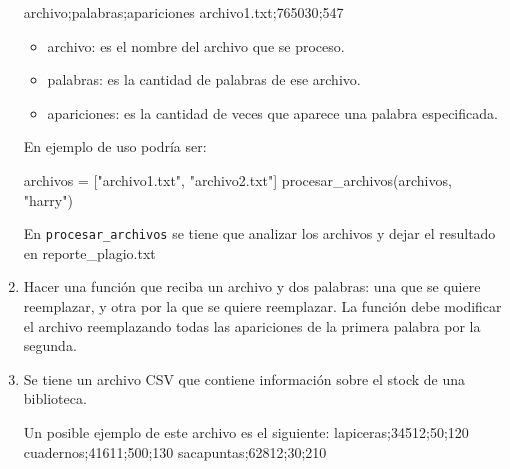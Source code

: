 \documentclass[
  letterpaper,
  DIV=11,
  numbers=noendperiod]{scrreprt}
\newenvironment{Shaded}{\begin{snugshade}}{\end{snugshade}}
\newcommand{\ExtensionTok}[1]{\textcolor[rgb]{0.00,0.23,0.31}{#1}}
\newcommand{\KeywordTok}[1]{\textcolor[rgb]{0.00,0.23,0.31}{#1}}
\newcommand{\NormalTok}[1]{\textcolor[rgb]{0.00,0.23,0.31}{#1}}
\newcommand{\OperatorTok}[1]{\textcolor[rgb]{0.37,0.37,0.37}{#1}}
\newcommand{\StringTok}[1]{\textcolor[rgb]{0.13,0.47,0.30}{#1}}
\providecommand{\tightlist}{%
  \setlength{\itemsep}{0pt}\setlength{\parskip}{0pt}}\usepackage{longtable,booktabs,array}
\begin{document}
\begin{enumerate}
\begin{Shaded}
\begin{Highlighting}[]
\ExtensionTok{archivo}\KeywordTok{;}\ExtensionTok{palabras}\KeywordTok{;}\ExtensionTok{apariciones}
\ExtensionTok{archivo1.txt}\KeywordTok{;}\ExtensionTok{765030}\KeywordTok{;}\ExtensionTok{547}
\end{Highlighting}
\end{Shaded}

  \begin{itemize}
  \tightlist
  \item
    archivo: es el nombre del archivo que se proceso.
  \item
    palabras: es la cantidad de palabras de ese archivo.
  \item
    apariciones: es la cantidad de veces que aparece una palabra
    especificada.
  \end{itemize}

  En ejemplo de uso podría ser:

\begin{Shaded}
\begin{Highlighting}[]
\NormalTok{archivos }\OperatorTok{=}\NormalTok{ [}\StringTok{"archivo1.txt"}\NormalTok{, }\StringTok{"archivo2.txt"}\NormalTok{]}
\NormalTok{procesar\_archivos(archivos, }\StringTok{"harry"}\NormalTok{)}
\end{Highlighting}
\end{Shaded}

  En \texttt{procesar\_archivos} se tiene que analizar los archivos y
  dejar el resultado en reporte\_plagio.txt
\item
  Hacer una función que reciba un archivo y dos palabras: una que se
  quiere reemplazar, y otra por la que se quiere reemplazar. La función
  debe modificar el archivo reemplazando todas las apariciones de la
  primera palabra por la segunda.
\item
  Se tiene un archivo CSV que contiene información sobre el stock de una
  biblioteca.

\begin{Shaded}
\begin{Highlighting}[]
\ExtensionTok{Un}\NormalTok{ posible ejemplo de este archivo es el siguiente: }
    \ExtensionTok{lapiceras}\KeywordTok{;}\ExtensionTok{34512}\KeywordTok{;}\ExtensionTok{50}\KeywordTok{;}\ExtensionTok{120}
    \ExtensionTok{cuadernos}\KeywordTok{;}\ExtensionTok{41611}\KeywordTok{;}\ExtensionTok{500}\KeywordTok{;}\ExtensionTok{130}
    \ExtensionTok{sacapuntas}\KeywordTok{;}\ExtensionTok{62812}\KeywordTok{;}\ExtensionTok{30}\KeywordTok{;}\ExtensionTok{210}
\end{Highlighting}
\end{Shaded}


\end{enumerate}
\end{document}
